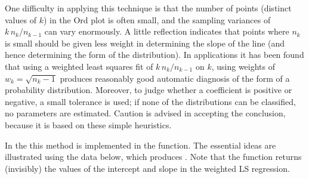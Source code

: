 \documentclass[11pt]{book}
\begin{document}
One difficulty in applying this technique is that the number of points
(distinct values of $k$)
in the Ord plot is often small, and the sampling variances of
\(k \,  n_k /  n_{k-1}\) can vary enormously.
A little reflection indicates that points where $n_k$ is small
should be given less weight in determining the slope of the
line (and hence determining the form of the distribution).
In applications it has been found that
using a weighted least squares fit of \(k \,
n_k /  n_{k-1}\) on \(k\), using weights of \(w_k = \sqrt { n_k -1
}\)
produces reasonably good
automatic diagnosis of the form of a
probability distribution. Moreover, to judge whether a coefficient is
positive or negative, a small tolerance is used;  if none of the distributions
can be classified, no parameters are estimated.  Caution is advised in
accepting the conclusion, because it is based on these simple heuristics.

In the  this method is implemented in the 
function. The essential ideas are illustrated using the 
 data below, which produces . Note that the
function returns (invisibly) the values of the intercept and slope in the
weighted LS regression.
\end{document}
